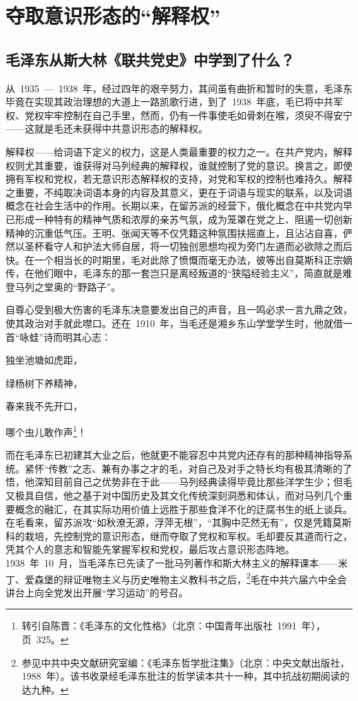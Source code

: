 
\chapter{夺取意识形态的“解释权”}

\section{毛泽东从斯大林《联共党史》中学到了什么？}

从~1935~—~1938~年，经过四年的艰辛努力，其间虽有曲折和暂时的失意，毛泽东毕竟在实现其政治理想的大道上一路凯歌行进，到了~1938~年底，毛已将中共军权、党权牢牢控制在自己手里，然而，仍有一件事使毛如骨刺在喉，须臾不得安宁——这就是毛还未获得中共意识形态的解释权。

解释权——给词语下定义的权力，这是人类最重要的权力之一。在共产党内，解释权则尤其重要，谁获得对马列经典的解释权，谁就控制了党的意识。换言之，即使拥有军权和党权，若无意识形态解释权的支持，对党和军权的控制也难持久。解释之重要，不纯取决词语本身的内容及其意义，更在于词语与现实的联系，以及词语概念在社会生活中的作用。长期以来，在留苏派的经营下，俄化概念在中共党内早已形成一种特有的精神气质和浓厚的亲苏气氛，成为笼罩在党之上、阻遏一切创新精神的沉重低气压。王明、张闻天等不仅凭籍这种氛围扶摇直上，且沾沾自喜，俨然以圣杯看守人和护法大师自居，将一切独创思想均视为旁门左道而必欲除之而后快。在一个相当长的时期里，毛对此除了愤慨而毫无办法，彼等出自莫斯科正宗嫡传，在他们眼中，毛泽东的那一套岂只是离经叛道的“狭隘经验主义”，简直就是难登马列之堂奥的“野路子”。

自尊心受到极大伤害的毛泽东决意要发出自己的声音，且一鸣必求一言九鼎之效，使其政治对手就此噤口。还在~1910~年，当毛还是湘乡东山学堂学生时，他就借一首“咏蛙”诗而明其心志：

\begin{quoting}
独坐池塘如虎距，

绿杨树下养精神，

春来我不先开口，

哪个虫儿敢作声\footnote{转引自陈晋：《毛泽东的文化性格》（北京：中国青年出版社~1991~年），页~325。}！
\end{quoting}

而在毛泽东已初建其大业之后，他就更不能容忍中共党内还存有的那种精神指导系统。紧怀“传教”之志、兼有办事之才的毛，对自己及对手之特长均有极其清晰的了悟，他深知目前自己之优势非在于此——马列经典读得毕竟比那些洋学生少；但毛又极具自信，他之基于对中国历史及其文化传统深刻洞悉和体认，而对马列几个重要概念的融汇，在其实际功用价值上远胜于那些食洋不化的迂腐书生的纸上谈兵。在毛看来，留苏派攻“如秋潦无源，浮萍无根”，“其胸中茫然无有”，仅是凭籍莫斯科的栽培，先控制党的意识形态，继而夺取了党权和军权。毛却要反其道而行之，凭其个人的意志和智能先掌握军权和党权，最后攻占意识形态阵地。1938~年~10~月，当毛泽东已先读了一批马列著作和斯大林主义的解释课本——米丁、爱森堡的辩证唯物主义与历史唯物主义教科书之后，\footnote{参见中共中央文献研究室编：《毛泽东哲学批注集》（北京：中央文献出版社，1988~年）。该书收录经毛泽东批注的哲学读本共十一种，其中抗战初期阅读的达九种。}毛在中共六届六中全会讲台上向全党发出开展“学习运动”的号召。

